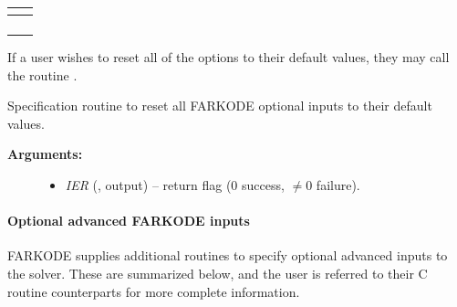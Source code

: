 \documentclass[letterpaper,10pt,english]{sphinxmanual}
\begin{document}
\begin{tabulary}{\linewidth}{|L|L|}
\hline
{}
 & 
{\hyperref[c_interface/User_callable:c.ARKodeSetMaxCFailGrowth]{\emph{}}}
\\
\hline
{}
 & 
{\hyperref[c_interface/User_callable:c.ARKodeSetNonlinCRDown]{\emph{}}}
\\
\hline
{}
 & 
{\hyperref[c_interface/User_callable:c.ARKodeSetNonlinRDiv]{\emph{}}}
\\
\hline
{}
 & 
{\hyperref[c_interface/User_callable:c.ARKodeSetDeltaGammaMax]{\emph{}}}
\\
\hline
{}
 & 
{\hyperref[c_interface/User_callable:c.ARKodeSetFixedStep]{\emph{}}}
\\
\hline\end{tabulary}


If a user wishes to reset all of the options to their default values,
they may call the routine {\hyperref[f_interface/Usage:f/_/FARKSETDEFAULTS]{\emph{}}}.

\begin{fulllineitems}
\label{f_interface/Usage:f/_/FARKSETDEFAULTS}
Specification routine to reset all FARKODE optional
inputs to their default values.
\begin{description}
\item[{\textbf{Arguments:}}] \leavevmode\begin{itemize}
\item {} 
\emph{IER} (, output) -- return flag (0 success, \(\ne 0\) failure).

\end{itemize}

\end{description}

\end{fulllineitems}



\paragraph{Optional advanced FARKODE inputs}
\label{f_interface/Usage:optional-advanced-farkode-inputs}
FARKODE supplies additional routines to specify optional advanced
inputs to the {\hyperref[c_interface/User_callable:c.ARKode]{\emph{}}} solver.  These are summarized below,
and the user is referred to their C routine counterparts for more
complete information.
\end{document}
